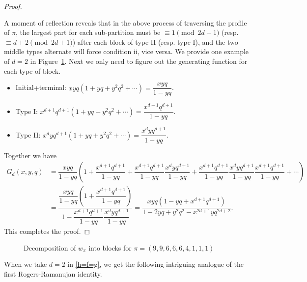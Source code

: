 \documentclass[12pt]{amsart}
\numberwithin{equation}{section}
\theoremstyle{plain}
\theoremstyle{definition}
\begin{document}
\begin{proof}
\begin{itemize}
\end{itemize}
A moment of reflection reveals that in the above process of traversing the profile of $\pi$, the largest part for each sub-partition must be $\equiv 1 \pmod{2d+1}$ (resp. $\equiv d+2 \pmod{2d+1}$) after each block of type II (resp. type I), and the two middle types alternate will force condition ii, vice versa. We provide one example of $d=2$ in Figure~\ref{block}. Next we only need to figure out the generating function for each type of block.
\begin{itemize}
\item Initial$+$terminal: $xyq(1+yq+y^2q^2+\cdots)=\dfrac{xyq}{1-yq}$.
\item Type I: $x^{d+1}q^{d+1}(1+yq+y^2q^2+\cdots)=\dfrac{x^{d+1}q^{d+1}}{1-yq}$.
\item Type II: $x^dyq^{d+1}(1+yq+y^2q^2+\cdots)=\dfrac{x^{d}yq^{d+1}}{1-yq}$.
\end{itemize}
Together we have
\begin{align*}
G_d(x,y,q) &=\dfrac{xyq}{1-yq}(1+\dfrac{x^{d+1}q^{d+1}}{1-yq}+\dfrac{x^{d+1}q^{d+1}}{1-yq}\dfrac{x^{d}yq^{d+1}}{1-yq}+\dfrac{x^{d+1}q^{d+1}}{1-yq}\dfrac{x^{d}yq^{d+1}}{1-yq}\dfrac{x^{d+1}q^{d+1}}{1-yq}+\cdots)\\
&=\dfrac{\dfrac{xyq}{1-yq}(1+\dfrac{x^{d+1}q^{d+1}}{1-yq})}{1-\dfrac{x^{d+1}q^{d+1}}{1-yq}\dfrac{x^{d}yq^{d+1}}{1-yq}}=\dfrac{xyq(1-yq+x^{d+1}q^{d+1})}{1-2yq+y^2q^2-x^{2d+1}yq^{2d+2}}.
\end{align*}
This completes the proof.
\end{proof}
\begin{figure}
\caption{Decomposition of $w_{\pi}$ into blocks for $\pi=(9,9,6,6,6,4,1,1,1)$}
\label{block}
\end{figure}
When we take $d=2$ in \eqref{h=f=g}, we get the following intriguing analogue of the first Rogers-Ramanujan identity.
\end{document}
